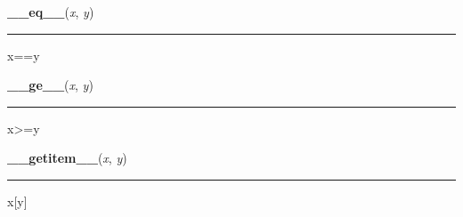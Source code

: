     \label{posix:statvfs_result:__eq__}

    \vspace{0.5ex}

\hspace{.8\funcindent}\begin{boxedminipage}{\funcwidth}

    \raggedright \textbf{\_\_eq\_\_}(\textit{x}, \textit{y})

    \vspace{-1.5ex}

    \rule{\textwidth}{0.5\fboxrule}
\setlength{\parskip}{2ex}
    x==y

\setlength{\parskip}{1ex}
    \end{boxedminipage}

    \label{posix:statvfs_result:__ge__}

    \vspace{0.5ex}

\hspace{.8\funcindent}\begin{boxedminipage}{\funcwidth}

    \raggedright \textbf{\_\_ge\_\_}(\textit{x}, \textit{y})

    \vspace{-1.5ex}

    \rule{\textwidth}{0.5\fboxrule}
\setlength{\parskip}{2ex}
    x{\textgreater}=y

\setlength{\parskip}{1ex}
    \end{boxedminipage}

    \label{posix:statvfs_result:__getitem__}

    \vspace{0.5ex}

\hspace{.8\funcindent}\begin{boxedminipage}{\funcwidth}

    \raggedright \textbf{\_\_getitem\_\_}(\textit{x}, \textit{y})

    \vspace{-1.5ex}

    \rule{\textwidth}{0.5\fboxrule}
\setlength{\parskip}{2ex}
    x[y]

\setlength{\parskip}{1ex}
    \end{boxedminipage}

